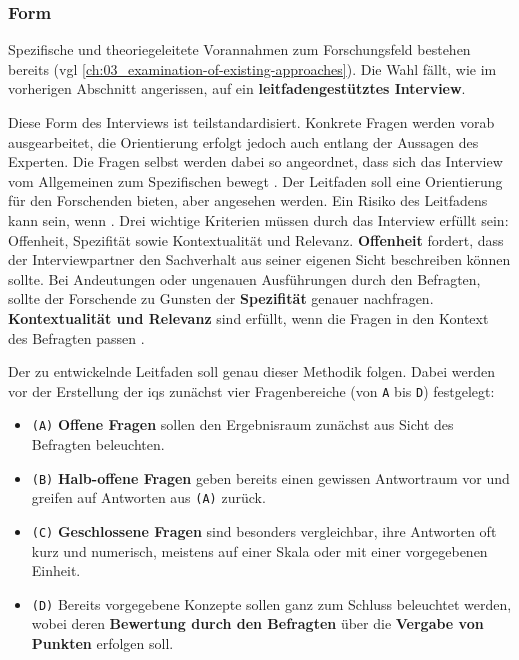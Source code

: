 \subsubsection{Form}
\label{subsubsec:04-01-02-02_form}

Spezifische und theoriegeleitete Vorannahmen zum Forschungsfeld bestehen bereits (\acrshort{vgl} \autoref{ch:03_examination-of-existing-approaches}). Die Wahl fällt, wie im vorherigen Abschnitt angerissen, auf ein \textbf{leitfadengestütztes Interview}.

Diese Form des Interviews ist teilstandardisiert. Konkrete Fragen werden vorab ausgearbeitet, die Orientierung erfolgt jedoch auch entlang der Aussagen des Experten. Die Fragen selbst werden dabei so angeordnet, dass sich das Interview vom Allgemeinen zum Spezifischen bewegt \cite{205:Leitfadengestuetztes-Interview}. Der Leitfaden soll eine Orientierung für den Forschenden bieten, aber  \cite{401:Das-Experteninterview} angesehen werden. Ein Risiko des Leitfadens kann sein, wenn  \cite{401:Das-Experteninterview}. Drei wichtige Kriterien müssen durch das Interview erfüllt sein: Offenheit, Spezifität sowie Kontextualität und Relevanz. \textbf{Offenheit} fordert, dass der Interviewpartner den Sachverhalt aus seiner eigenen Sicht beschreiben können sollte. Bei Andeutungen oder ungenauen Ausführungen durch den Befragten, sollte der Forschende zu Gunsten der \textbf{Spezifität} genauer nachfragen. \textbf{Kontextualität und Relevanz} sind erfüllt, wenn die Fragen in den Kontext des Befragten passen \cite{205:Leitfadengestuetztes-Interview}.

Der zu entwickelnde Leitfaden soll genau dieser Methodik folgen. Dabei werden vor der Erstellung der \Glspl{iq} zunächst vier Fragenbereiche (von \texttt{A} bis \texttt{D}) festgelegt:

\begin{itemize}
    \item \texttt{(A)} \textbf{Offene Fragen} sollen den Ergebnisraum zunächst aus Sicht des Befragten beleuchten.
    \item \texttt{(B)} \textbf{Halb-offene Fragen} geben bereits einen gewissen Antwortraum vor und greifen auf Antworten aus \texttt{(A)} zurück.
    \item \texttt{(C)} \textbf{Geschlossene Fragen} sind besonders vergleichbar, ihre Antworten oft kurz und numerisch, meistens auf einer Skala oder mit einer vorgegebenen Einheit.
    \item \texttt{(D)} Bereits vorgegebene Konzepte sollen ganz zum Schluss beleuchtet werden, wobei deren \textbf{Bewertung durch den Befragten} über die \textbf{Vergabe von Punkten} erfolgen soll.
\end{itemize}

